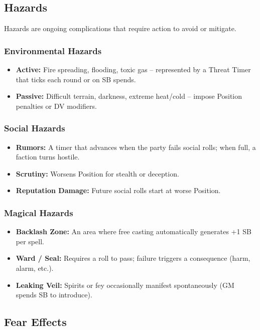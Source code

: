 \subsection{Hazards}

Hazards are ongoing complications that require action to avoid or mitigate.

\subsubsection{Environmental Hazards}
\begin{itemize}
  \item \textbf{Active:} Fire spreading, flooding, toxic gas -- represented by a Threat Timer that ticks each round or on SB spends.
  \item \textbf{Passive:} Difficult terrain, darkness, extreme heat/cold -- impose Position penalties or DV modifiers.
\end{itemize}

\subsubsection{Social Hazards}
\begin{itemize}
  \item \textbf{Rumors:} A timer that advances when the party fails social rolls; when full, a faction turns hostile.
  \item \textbf{Scrutiny:} Worsens Position for stealth or deception.
  \item \textbf{Reputation Damage:} Future social rolls start at worse Position.
\end{itemize}

\subsubsection{Magical Hazards}
\begin{itemize}
  \item \textbf{Backlash Zone:} An area where free casting automatically generates +1 SB per spell.
  \item \textbf{Ward / Seal:} Requires a roll to pass; failure triggers a consequence (harm, alarm, etc.).
  \item \textbf{Leaking Veil:} Spirits or fey occasionally manifest spontaneously (GM spends SB to introduce).
\end{itemize}

\subsection{Fear Effects}

